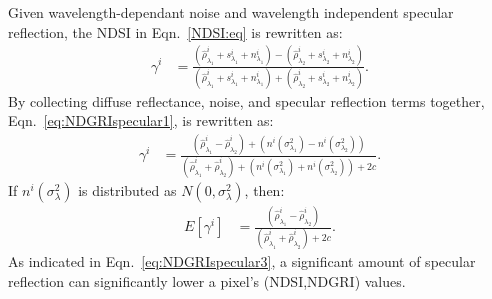 \documentclass[10pt,journal,cspaper,compsoc]{IEEEtran}
\begin{document}
Given wavelength-dependant noise and wavelength independent specular reflection, the NDSI in Eqn.~\ref{NDSI:eq} is rewritten as:
\begin{align}
\gamma^i &= \frac{\left(\hat{\rho}^i_{\lambda_1} + s^i_{\lambda_1} + n^i_{\lambda_1}\right) -
                  \left(\hat{\rho}^i_{\lambda_2} + s^i_{\lambda_2} + n^i_{\lambda_2}\right)}
                 {\left(\hat{\rho}^i_{\lambda_1} + s^i_{\lambda_1} + n^i_{\lambda_1}\right) + 
                  \left(\hat{\rho}^i_{\lambda_2} + s^i_{\lambda_2} + n^i_{\lambda_2}\right)}.
\label{eq:NDGRIspecular1}
\end{align}
\noindent By collecting diffuse reflectance, noise, and specular reflection terms together, Eqn.~\ref{eq:NDGRIspecular1}, 
is rewritten as:
\begin{align}
\gamma^i & = \frac{\left(\hat{\rho}^i_{\lambda_1} - \hat{\rho}^i_{\lambda_2} \right) + 
                   \left(n^i\left(\sigma^2_{\lambda_1}\right) - n^i\left(\sigma^2_{\lambda_2} \right) \right)}
                 {\left(\hat{\rho}^i_{\lambda_1} + \hat{\rho}^i_{\lambda_2} \right) + 
                  \left(n^i\left(\sigma^2_{\lambda_1}\right) + n^i\left(\sigma^2_{\lambda_2} \right) \right) + 2c}.
\label{eq:NDGRIspecular2}
\end{align}
\noindent If $n^i\left(\sigma^2_{\lambda}\right)$ is distributed as $N\left(0,\sigma^2_{\lambda}\right)$, then:
\begin{align}
E[\gamma^i] &= \frac{\left(\hat{\rho}^i_{\lambda_1} - \hat{\rho}^i_{\lambda_2} \right)}
                 {\left(\hat{\rho}^i_{\lambda_1} + \hat{\rho}^i_{\lambda_2} \right) + 2c}.
\label{eq:NDGRIspecular3}
\end{align}
\noindent As indicated in Eqn.~\ref{eq:NDGRIspecular3}, a significant amount of specular reflection can 
significantly lower a pixel's (NDSI,NDGRI) values.
\end{document}
